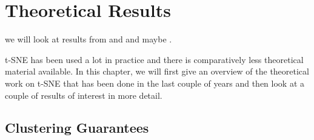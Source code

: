 \chapter{Theoretical Results}\label{chapter:theoretical_results}
we will look at results from \cite{murray2024largedatalimitsscaling} and \cite{LinStei22} and maybe \cite{Cai22}. 


t-SNE has been used a lot in practice and there is comparatively less theoretical material available. In this chapter, we will first give an overview of the theoretical work on t-SNE that has been done in the last couple of years and then look at a couple of results of interest in more detail. 

\section{Clustering Guarantees}
